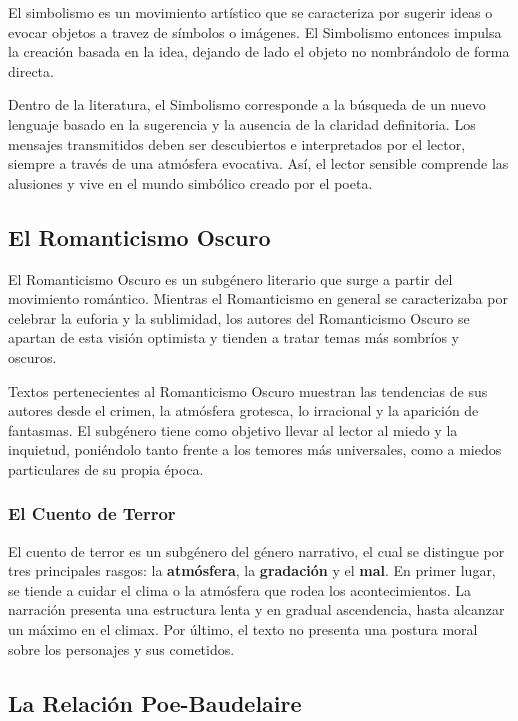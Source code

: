 \documentclass{article}
\begin{document}
El simbolismo es un movimiento artístico que se caracteriza por sugerir ideas o evocar objetos a travez de símbolos o imágenes. El Simbolismo entonces impulsa la creación basada en la idea, dejando de lado el objeto no nombrándolo de forma directa.

Dentro de la literatura, el Simbolismo corresponde a la búsqueda de un nuevo lenguaje basado en la sugerencia y la ausencia de la claridad definitoria. Los mensajes transmitidos deben ser descubiertos e interpretados por el lector, siempre a través de una atmósfera evocativa. Así, el lector sensible comprende las alusiones y vive en el mundo simbólico creado por el poeta.

\subsection{El Romanticismo Oscuro}

El Romanticismo Oscuro es un subgénero literario que surge a partir del movimiento romántico. Mientras el Romanticismo en general se caracterizaba por celebrar la euforia y la sublimidad, los autores del Romanticismo Oscuro se apartan de esta visión optimista y tienden a tratar temas más sombríos y oscuros.

Textos pertenecientes al Romanticismo Oscuro muestran las tendencias de sus autores desde el crimen, la atmósfera grotesca, lo irracional y la aparición de fantasmas. El subgénero tiene como objetivo llevar al lector al miedo y la inquietud, poniéndolo tanto frente a los temores más universales, como a miedos particulares de su propia época.

\subsubsection*{El Cuento de Terror}

El cuento de terror es un subgénero del género narrativo, el cual se distingue por tres principales rasgos: la \textbf{atmósfera}, la \textbf{gradación} y el \textbf{mal}. En primer lugar, se tiende a cuidar el clima o la atmósfera que rodea los acontecimientos. La narración presenta una estructura lenta y en gradual ascendencia, hasta alcanzar un máximo en el climax. Por último, el texto no presenta una postura moral sobre los personajes y sus cometidos.

\subsection{La Relación Poe-Baudelaire}
\end{document}
